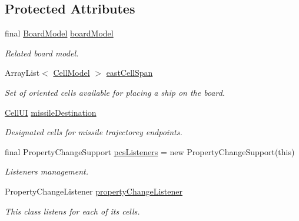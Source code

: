 \subsection*{Protected Attributes}
\begin{DoxyCompactItemize}
\item 
final \hyperlink{classbattleship2D_1_1model_1_1BoardModel}{Board\-Model} \hyperlink{classbattleship2D_1_1ui_1_1BoardUI_a6c61b16484c780fb58e68bc8fb1494e6}{board\-Model}
\begin{DoxyCompactList}\small\item\em Related board model. \end{DoxyCompactList}\item 
Array\-List$<$ \hyperlink{classbattleship2D_1_1model_1_1CellModel}{Cell\-Model} $>$ \hyperlink{classbattleship2D_1_1ui_1_1BoardUI_a315014776bda2cb2a79e90d62a41c0af}{east\-Cell\-Span}
\begin{DoxyCompactList}\small\item\em Set of oriented cells available for placing a ship on the board. \end{DoxyCompactList}\item 
\hyperlink{classbattleship2D_1_1ui_1_1CellUI}{Cell\-U\-I} \hyperlink{classbattleship2D_1_1ui_1_1BoardUI_a97417a860426981ff901e82029b4936e}{missile\-Destination}
\begin{DoxyCompactList}\small\item\em Designated cells for missile trajectorey endpoints. \end{DoxyCompactList}\item 
final Property\-Change\-Support \hyperlink{classbattleship2D_1_1ui_1_1BoardUI_a7ef95a87641c7018a8ff78e9a0a5ab3a}{pcs\-Listeners} = new Property\-Change\-Support(this)
\begin{DoxyCompactList}\small\item\em Listeners management. \end{DoxyCompactList}\item 
Property\-Change\-Listener \hyperlink{classbattleship2D_1_1ui_1_1BoardUI_a457c5910efd06093f84977cd1e464891}{property\-Change\-Listener}
\begin{DoxyCompactList}\small\item\em This class listens for each of its cells. \end{DoxyCompactList}\end{DoxyCompactItemize}
